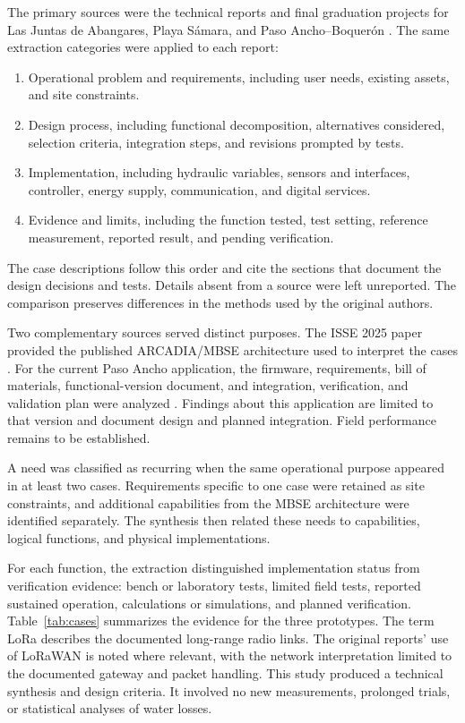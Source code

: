 \documentclass[conference]{IEEEtran}
\begin{document}
The primary sources were the technical reports and final graduation projects for Las Juntas de Abangares, Playa Sámara, and Paso Ancho--Boquerón \cite{chavarria2021implementacion,solorzano2021sistema,oviedo2024desarrollo}. The same extraction categories were applied to each report:
\begin{enumerate}
\item Operational problem and requirements, including user needs, existing assets, and site constraints.
\item Design process, including functional decomposition, alternatives considered, selection criteria, integration steps, and revisions prompted by tests.
\item Implementation, including hydraulic variables, sensors and interfaces, controller, energy supply, communication, and digital services.
\item Evidence and limits, including the function tested, test setting, reference measurement, reported result, and pending verification.
\end{enumerate}
The case descriptions follow this order and cite the sections that document the design decisions and tests. Details absent from a source were left unreported. The comparison preserves differences in the methods used by the original authors.

Two complementary sources served distinct purposes. The ISSE 2025 paper provided the published ARCADIA/MBSE architecture used to interpret the cases \cite{arguedas2025towards}. For the current Paso Ancho application, the firmware, requirements, bill of materials, functional-version document, and integration, verification, and validation plan were analyzed \cite{deltalabo2026repo}. Findings about this application are limited to that version and document design and planned integration. Field performance remains to be established.

A need was classified as recurring when the same operational purpose appeared in at least two cases. Requirements specific to one case were retained as site constraints, and additional capabilities from the MBSE architecture were identified separately. The synthesis then related these needs to capabilities, logical functions, and physical implementations.

For each function, the extraction distinguished implementation status from verification evidence: bench or laboratory tests, limited field tests, reported sustained operation, calculations or simulations, and planned verification. Table~\ref{tab:cases} summarizes the evidence for the three prototypes. The term LoRa describes the documented long-range radio links. The original reports' use of LoRaWAN is noted where relevant, with the network interpretation limited to the documented gateway and packet handling. This study produced a technical synthesis and design criteria. It involved no new measurements, prolonged trials, or statistical analyses of water losses.
\end{document}

